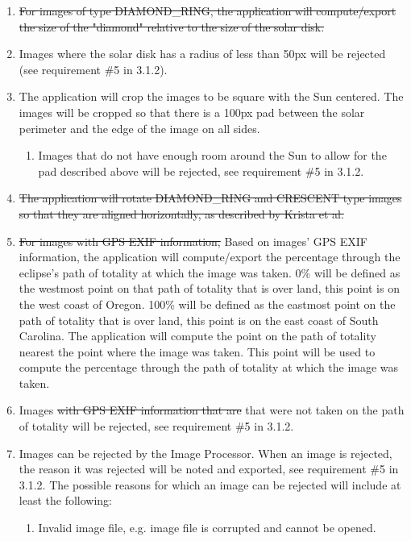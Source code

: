 \documentclass[10pt, onecolumn, draftclsnofoot, letterpaper, compsoc]{IEEEtran}
\begin{document}
\begin{enumerate}
		\item \sout{For images of type DIAMOND\_RING, the application will 
		compute/export the size of the "diamond" relative to the size of 
		the solar disk.}

		\item Images where the solar disk has a radius of less than 50px
		will be rejected (see requirement \#5 in 3.1.2).

		\item The application will crop the images to be square with the 
		Sun centered. The images will be cropped so that there is a 100px
		pad between the solar perimeter and the edge of the image on all 
		sides.
		\begin{enumerate}
			\item Images that do not have enough room around the Sun to 
			allow for the pad described above will be rejected, see requirement \#5 in 3.1.2.
		\end{enumerate}

		\item \sout{The application will rotate DIAMOND\_RING and CRESCENT type 
		images so that they are aligned horizontally, as described by 
		Krista et al.}

		\item \sout{For images with GPS EXIF information,} Based on images' GPS EXIF information, the application will 
		compute/export the percentage through the eclipse's path of 
		totality at which the image was taken. 0\% will be defined as the 
		westmost point on that path of totality that is over land, this 
		point is on the west coast of Oregon. 100\% will be defined as the 
		eastmost point on the path of totality that is over land, this 
		point is on the east coast of South Carolina. The application will
		compute the point on the path of totality nearest the point where 
		the image was taken. This point will be used to compute the 
		percentage through the path of totality at which the image was 
		taken.

		\item Images \sout{with GPS EXIF information that are} that were not taken on the path of
		totality will be rejected, see requirement \#5 in 3.1.2.

		\item Images can be rejected by the Image Processor. When an image is rejected,
		the reason it was rejected will be noted and exported, see requirement \#5 in 3.1.2.
		The possible reasons for which an image can be rejected will include at least the 
		following:
		\begin{enumerate}
			\item Invalid image file, e.g. image file is corrupted and cannot be opened.


\end{enumerate}
\end{enumerate}
\end{document}

